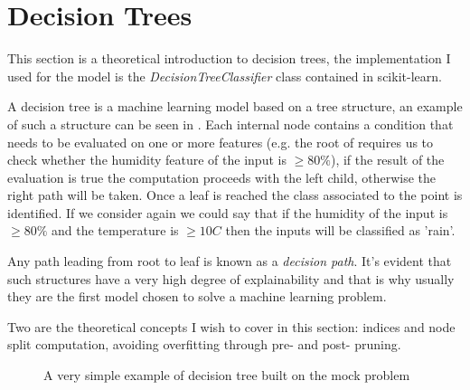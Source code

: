 \section{Decision Trees}
\label{sec:dt}
This section is a theoretical introduction to decision trees, the implementation I used for the
model is the \emph{DecisionTreeClassifier} class contained in scikit-learn.

\medskip

A decision tree is a machine learning model based on a tree structure, an example of such a
structure can be seen in . Each internal node contains a condition that needs to
be evaluated on one or more features (e.g. the root of  requires us to check
whether the humidity feature of the input is $\geq 80\%$), if the result of the evaluation is true
the computation proceeds with the left child, otherwise the right path will be taken. Once a leaf is
reached the class associated to the point is identified. If we consider again 
we could say that if the humidity of the input is $\geq 80\%$ and the temperature is $\geq 10C$ then
the inputs will be classified as 'rain'.

Any path leading from root to leaf is known as a \emph{decision path}. It's evident that such structures have a very high degree of explainability and that is why usually they are the first model chosen to solve a machine learning problem.

\medskip

Two are the theoretical concepts I wish to cover in this section: indices and node split
computation, avoiding overfitting through pre- and post- pruning.
\begin{figure}
	\centering
	\caption{A very simple example of decision tree built on the mock problem}
	\label{fig:simple-dt}
\end{figure}
